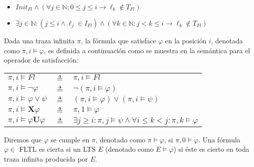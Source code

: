 \begin{itemize}
    \item $Init_{Fl} \land (\forall j \in \mathbb{N}: 0 \leq j \leq i \rightarrow \ell_k \notin T_{Fl} )$
    \item $\exists j \in \mathbb{N}: (j \leq i \land \ell_j \in I_{Fl}) \land (\forall k \in \mathbb{N}: j < k \leq i
    \rightarrow \ell_k \notin T_{Fl})$
\end{itemize}

\noindent Dada una traza infinita $\pi$, la fórmula que satisface $\varphi$ en la posición $i$, denotada como $\pi,i
\vDash \varphi$, es definida a continuación como se muestra en la semántica para el operador de satisfacción:

\begin{center}
\begin{tabular}{p{2cm}p{0.5cm}l}
    $\pi,i \vDash Fl$                        & $\triangleq$    & $\pi,i \vDash Fl$\\
    $\pi,i \vDash \neg\varphi$              & $\triangleq$    & $\neg(\pi,i \vDash \varphi)$\\
    $\pi,i \vDash \varphi \lor \psi$         & $\triangleq$    & $(\pi,i\vDash\varphi)\lor(\pi,i\vDash\psi)$\\
    $\pi,i \vDash \mathbf{X}\varphi$         & $\triangleq$    & $\pi,1 \vDash \varphi$\\
    $\pi,i \vDash \varphi\mathbf{U}\varphi$  & $\triangleq$    & $\exists j \geq i: \pi,j \vDash \psi\land\forall i \leq k < j:
    \pi,k \vDash \varphi$
\end{tabular}
\end{center}

Diremos que $\varphi$ se cumple en $\pi$, denotado como $\pi \vDash \varphi$, si $\pi,0 \vDash \varphi$. Una fórmula
$\varphi \in$ FLTL es cierta si un LTS $E$ (denotado como $E \vDash \varphi$) si éste es cierto en toda traza infinita
producida por $E$. 
